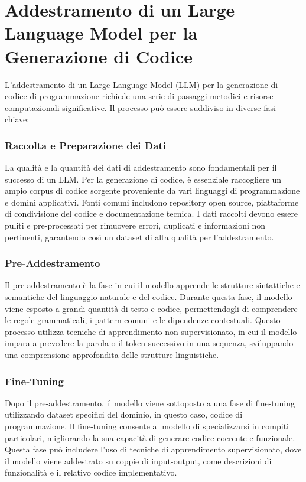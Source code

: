 \documentclass[12pt,a4paper,openright,twoside]{book}
\begin{document}
\chapter{Addestramento di un Large Language Model per la Generazione di Codice}

L'addestramento di un Large Language Model (LLM) per la generazione di codice di programmazione richiede una serie di passaggi metodici e risorse computazionali significative. Il processo può essere suddiviso in diverse fasi chiave:

\subsection*{Raccolta e Preparazione dei Dati}
La qualità e la quantità dei dati di addestramento sono fondamentali per il successo di un LLM. Per la generazione di codice, è essenziale raccogliere un ampio corpus di codice sorgente proveniente da vari linguaggi di programmazione e domini applicativi. Fonti comuni includono repository open source, piattaforme di condivisione del codice e documentazione tecnica. I dati raccolti devono essere puliti e pre-processati per rimuovere errori, duplicati e informazioni non pertinenti, garantendo così un dataset di alta qualità per l'addestramento.

\subsection*{Pre-Addestramento}
Il pre-addestramento è la fase in cui il modello apprende le strutture sintattiche e semantiche del linguaggio naturale e del codice. Durante questa fase, il modello viene esposto a grandi quantità di testo e codice, permettendogli di comprendere le regole grammaticali, i pattern comuni e le dipendenze contestuali. Questo processo utilizza tecniche di apprendimento non supervisionato, in cui il modello impara a prevedere la parola o il token successivo in una sequenza, sviluppando una comprensione approfondita delle strutture linguistiche.

\subsection*{Fine-Tuning}
Dopo il pre-addestramento, il modello viene sottoposto a una fase di fine-tuning utilizzando dataset specifici del dominio, in questo caso, codice di programmazione. Il fine-tuning consente al modello di specializzarsi in compiti particolari, migliorando la sua capacit\`a di generare codice coerente e funzionale. Questa fase può includere l'uso di tecniche di apprendimento supervisionato, dove il modello viene addestrato su coppie di input-output, come descrizioni di funzionalità e il relativo codice implementativo.
\end{document}

